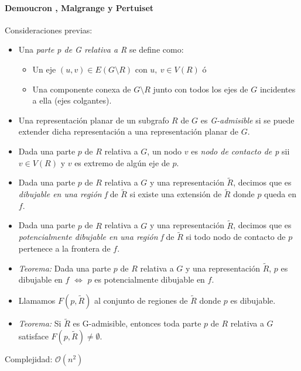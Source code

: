 \paragraph{Demoucron , Malgrange y Pertuiset}
Consideraciones previas:
\begin{itemize}
    \item Una \textit{parte p de G relativa a R} se define como:
        \begin{itemize}
            \item Un eje $(u,v) \in E(G \setminus R)$ con $u,\ v \in V(R)$ ó
            \item Una componente conexa de $G \setminus R$ junto con todos los ejes de $G$ incidentes a ella (ejes colgantes).
        \end{itemize}
    \item Una representación planar de un subgrafo $R$ de $G$ es \textit{G-admisible} si se puede extender dicha representación a una representación planar de $G$.
    \item Dada una parte $p$ de $R$ relativa a $G$, un nodo $v$ es \textit{nodo de contacto de p} sii $v \in V(R)$ y $v$ es extremo de algún eje de $p$.
    \item Dada una parte $p$ de $R$ relativa a $G$ y una representación $\tilde R$, decimos que es \textit{dibujable en una región f} de $\tilde R$ si existe una extensión de $\tilde R$ donde $p$ queda en $f$.
    \item Dada una parte $p$ de $R$ relativa a $G$ y una representación $\tilde R$, decimos que es \textit{potencialmente dibujable en una región f} de $\tilde R$ si todo nodo de contacto de $p$ pertenece a la frontera de $f$.
    \item \textit{Teorema:} Dada una parte $p$ de $R$ relativa a $G$ y una representación $\tilde R$, $p$ es dibujable en $f$ $\iff$ $p$ es potencialmente dibujable en $f$.
    \item Llamamos $F(p, \tilde R)$ al conjunto de regiones de $\tilde R$ donde $p$ es dibujable.
    \item \textit{Teorema:} Si $\tilde R$ es G-admisible, entonces toda parte $p$ de $R$ relativa a $G$ satisface $F(p, \tilde R) \neq \emptyset$.
\end{itemize}

Complejidad: $\mathcal{O}(n^2)$

